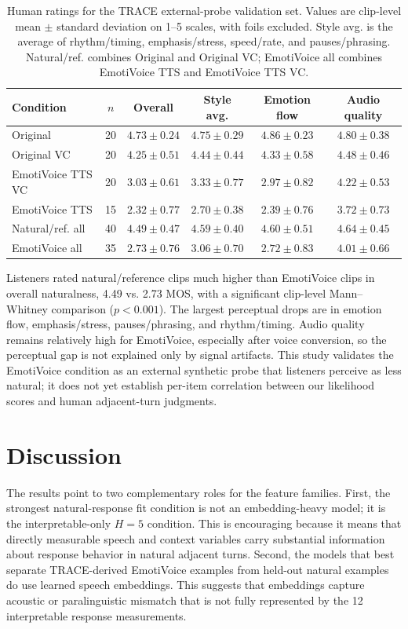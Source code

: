 \documentclass[conference]{IEEEtran}
\begin{document}
\begin{table}[t]
\centering
\caption{Human ratings for the TRACE external-probe validation set. Values are clip-level mean $\pm$ standard deviation on 1--5 scales, with foils excluded. Style avg. is the average of rhythm/timing, emphasis/stress, speed/rate, and pauses/phrasing. Natural/ref. combines Original and Original VC; EmotiVoice all combines EmotiVoice TTS and EmotiVoice TTS VC.}
\label{tab:human_eval}
\scriptsize
\setlength{\tabcolsep}{5.0pt}
\begin{tabular}{lccccc}
\toprule
Condition & $n$ & Overall & Style avg. & Emotion flow & Audio quality \\
\midrule
Original & 20 & $4.73 \pm 0.24$ & $4.75 \pm 0.29$ & $4.86 \pm 0.23$ & $4.80 \pm 0.38$ \\
Original VC & 20 & $4.25 \pm 0.51$ & $4.44 \pm 0.44$ & $4.33 \pm 0.58$ & $4.48 \pm 0.46$ \\
EmotiVoice TTS VC & 20 & $3.03 \pm 0.61$ & $3.33 \pm 0.77$ & $2.97 \pm 0.82$ & $4.22 \pm 0.53$ \\
EmotiVoice TTS & 15 & $2.32 \pm 0.77$ & $2.70 \pm 0.38$ & $2.39 \pm 0.76$ & $3.72 \pm 0.73$ \\
\midrule
Natural/ref. all & 40 & $4.49 \pm 0.47$ & $4.59 \pm 0.40$ & $4.60 \pm 0.51$ & $4.64 \pm 0.45$ \\
EmotiVoice all & 35 & $2.73 \pm 0.76$ & $3.06 \pm 0.70$ & $2.72 \pm 0.83$ & $4.01 \pm 0.66$ \\
\bottomrule
\end{tabular}
\end{table}

Listeners rated natural/reference clips much higher than EmotiVoice clips in overall naturalness, 4.49 vs. 2.73 MOS, with a significant clip-level Mann--Whitney comparison ($p<0.001$).
The largest perceptual drops are in emotion flow, emphasis/stress, pauses/phrasing, and rhythm/timing.
Audio quality remains relatively high for EmotiVoice, especially after voice conversion, so the perceptual gap is not explained only by signal artifacts.
This study validates the EmotiVoice condition as an external synthetic probe that listeners perceive as less natural; it does not yet establish per-item correlation between our likelihood scores and human adjacent-turn judgments.

\section{Discussion}
The results point to two complementary roles for the feature families.
First, the strongest natural-response fit condition is not an embedding-heavy model; it is the interpretable-only $H=5$ condition.
This is encouraging because it means that directly measurable speech and context variables carry substantial information about response behavior in natural adjacent turns.
Second, the models that best separate TRACE-derived EmotiVoice examples from held-out natural examples do use learned speech embeddings.
This suggests that embeddings capture acoustic or paralinguistic mismatch that is not fully represented by the 12 interpretable response measurements.
\end{document}
